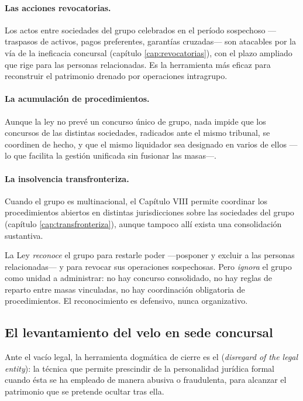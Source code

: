 \paragraph{Las acciones revocatorias.} Los actos entre sociedades del grupo celebrados en el período
sospechoso ---traspasos de activos, pagos preferentes, garantías cruzadas--- son atacables por la
vía de la ineficacia concursal (capítulo \ref{cap:revocatorias}), con el plazo ampliado que rige
para las personas relacionadas. Es la herramienta más eficaz para reconstruir el patrimonio drenado
por operaciones intragrupo.

\paragraph{La acumulación de procedimientos.} Aunque la ley no prevé un concurso único de grupo,
nada impide que los concursos de las distintas sociedades, radicados ante el mismo tribunal, se
coordinen de hecho, y que el mismo liquidador sea designado en varios de ellos ---lo que facilita la
gestión unificada sin fusionar las masas---.

\paragraph{La insolvencia transfronteriza.} Cuando el grupo es multinacional, el Capítulo VIII
permite coordinar los procedimientos abiertos en distintas jurisdicciones sobre las sociedades del
grupo (capítulo \ref{cap:transfronteriza}), aunque tampoco allí exista una consolidación
sustantiva.

\begin{alerta}
La Ley  \emph{reconoce} el grupo para restarle poder ---posponer y excluir a las
personas relacionadas--- y para revocar sus operaciones sospechosas. Pero \emph{ignora} el grupo
como unidad a administrar: no hay concurso consolidado, no hay reglas de reparto entre masas
vinculadas, no hay coordinación obligatoria de procedimientos. El reconocimiento es defensivo,
nunca organizativo.
\end{alerta}

\subsection{El levantamiento del velo en sede concursal}

Ante el vacío legal, la herramienta dogmática de cierre es el 
(\emph{disregard of the legal entity}): la técnica que permite prescindir de la personalidad
jurídica formal cuando ésta se ha empleado de manera abusiva o fraudulenta, para alcanzar el
patrimonio que se pretende ocultar tras ella.

